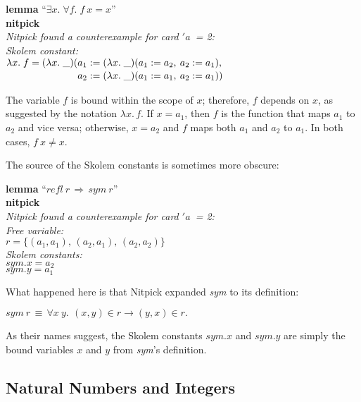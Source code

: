 \documentclass[a4paper,12pt]{article}
\def\undef{(\lambda x.\; \_)}
\renewcommand\_{\hbox{\textunderscore\kern-.05ex}}
\begin{document}
\prew
\textbf{lemma} ``$\exists x.\; \forall f.\; f~x = x$'' \\
\textbf{nitpick} \\[2\smallskipamount]
\slshape
Nitpick found a counterexample for \textit{card} $'a$~= 2: \\[2\smallskipamount]
\hbox{}\qquad Skolem constant: \nopagebreak \\
\hbox{}\qquad\qquad $\lambda x.\; f =
    \undef{}(\!\begin{aligned}[t]
    & a_1 := \undef{}(a_1 := a_2,\> a_2 := a_1), \\[-2pt]
    & a_2 := \undef{}(a_1 := a_1,\> a_2 := a_1))\end{aligned}$
\postw

The variable $f$ is bound within the scope of $x$; therefore, $f$ depends on
$x$, as suggested by the notation $\lambda x.\,f$. If $x = a_1$, then $f$ is the
function that maps $a_1$ to $a_2$ and vice versa; otherwise, $x = a_2$ and $f$
maps both $a_1$ and $a_2$ to $a_1$. In both cases, $f~x \not= x$.

The source of the Skolem constants is sometimes more obscure:

\prew
\textbf{lemma} ``$\mathit{refl}~r\,\Longrightarrow\, \mathit{sym}~r$'' \\
\textbf{nitpick} \\[2\smallskipamount]
\slshape
Nitpick found a counterexample for \textit{card} $'a$~= 2: \\[2\smallskipamount]
\hbox{}\qquad Free variable: \nopagebreak \\
\hbox{}\qquad\qquad $r = \{(a_1, a_1),\, (a_2, a_1),\, (a_2, a_2)\}$ \\
\hbox{}\qquad Skolem constants: \nopagebreak \\
\hbox{}\qquad\qquad $\mathit{sym}.x = a_2$ \\
\hbox{}\qquad\qquad $\mathit{sym}.y = a_1$
\postw

What happened here is that Nitpick expanded \textit{sym} to its definition:

\prew
$\mathit{sym}~r \,\equiv\,
 \forall x\> y.\,\> (x, y) \in r \longrightarrow (y, x) \in r.$
\postw

As their names suggest, the Skolem constants $\mathit{sym}.x$ and
$\mathit{sym}.y$ are simply the bound variables $x$ and $y$
from \textit{sym}'s definition.

\subsection{Natural Numbers and Integers}
\label{natural-numbers-and-integers}
\end{document}
